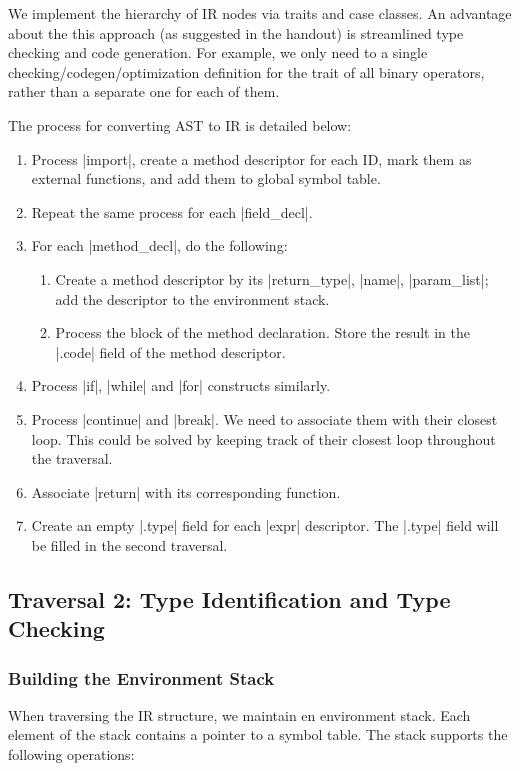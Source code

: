 We implement the hierarchy of IR nodes via traits and case classes. An advantage about the this approach (as suggested in the handout) is streamlined type checking and code generation. For example, we only need to a single checking/codegen/optimization definition for the trait of all binary operators, rather than a separate one for each of them.

The process for converting AST to IR is detailed below:
\begin{enumerate}
    \item Process |import|, create a method descriptor for each ID, mark them as external functions, and add them to global symbol table.
    \item Repeat the same process for each |field_decl|.
    \item For each |method_decl|, do the following:
    \begin{enumerate}
        \item Create a method descriptor by its |return_type|, |name|, |param_list|; add the descriptor to the environment stack.
        \item Process the block of the method declaration. Store the result in the |.code| field of the method descriptor.
    \end{enumerate}
    \item Process |if|, |while| and |for| constructs similarly.
    \item Process |continue| and |break|. We need to associate them with their closest loop. This could be solved by keeping track of their closest loop throughout the traversal.
    \item Associate |return| with its corresponding function.
    \item Create an empty |.type| field for each |expr| descriptor. The |.type| field will be filled in the second traversal. 
\end{enumerate}

\subsection{Traversal 2: Type Identification and Type Checking}

\subsubsection{Building the Environment Stack}

When traversing the IR structure, we maintain en environment stack. Each element of the stack contains a pointer to a symbol table. The stack supports the following operations:

